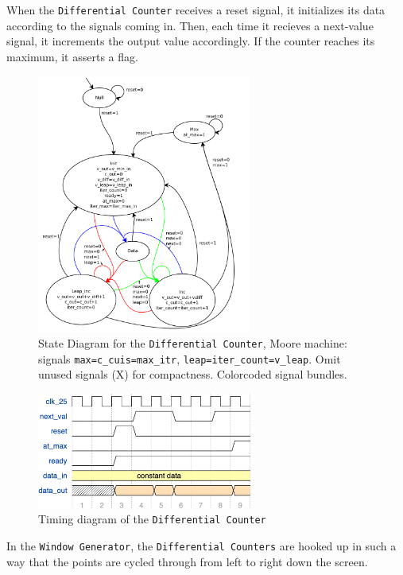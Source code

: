 \documentclass{article}
\begin{document}
When the \texttt{Differential Counter} receives a reset signal, it initializes its data according to the signals coming in.
Then, each time it recieves a next-value signal, it increments the output value accordingly. If the counter reaches
its maximum, it asserts a flag.

\begin{figure}
  \centering
    \includegraphics[width=200pt]{state_diagrams/diff_counter.pdf}
  \caption{State Diagram for the \texttt{Differential Counter}, Moore machine: signals
    \texttt{max=c\_cuis=max\_itr}, \texttt{leap=iter\_count=v\_leap}. Omit
    unused signals (X) for compactness. Colorcoded signal bundles.}
\end{figure}

\begin{figure}
  \centering
    \includegraphics[width=200pt]{timing_diagrams/diff_counter.pdf}
  \caption{Timing diagram of the \texttt{Differential Counter}}
\end{figure}

In the \texttt{Window Generator}, the \texttt{Differential Counters} are hooked up in such a way that the points are cycled through
from left to right down the screen.
\end{document}
